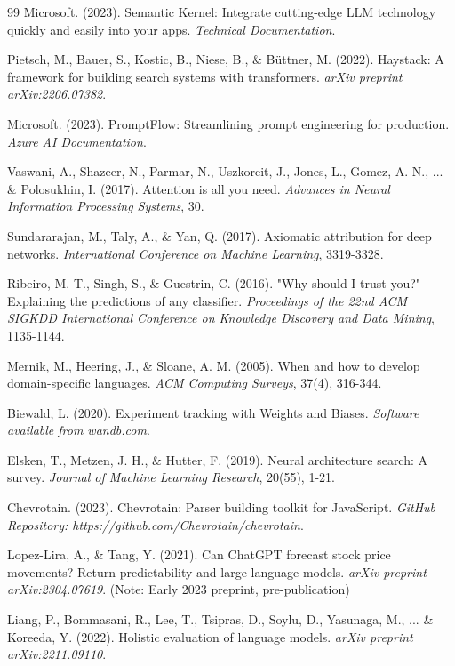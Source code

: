 \documentclass[11pt,a4paper]{article}
\begin{document}
\begin{thebibliography}{99}
Microsoft. (2023).
Semantic Kernel: Integrate cutting-edge LLM technology quickly and easily into your apps.
\textit{Technical Documentation}.

Pietsch, M., Bauer, S., Kostic, B., Niese, B., \& Büttner, M. (2022).
Haystack: A framework for building search systems with transformers.
\textit{arXiv preprint arXiv:2206.07382}.

Microsoft. (2023).
PromptFlow: Streamlining prompt engineering for production.
\textit{Azure AI Documentation}.

Vaswani, A., Shazeer, N., Parmar, N., Uszkoreit, J., Jones, L., Gomez, A. N., ... \& Polosukhin, I. (2017).
Attention is all you need.
\textit{Advances in Neural Information Processing Systems}, 30.

Sundararajan, M., Taly, A., \& Yan, Q. (2017).
Axiomatic attribution for deep networks.
\textit{International Conference on Machine Learning}, 3319-3328.

Ribeiro, M. T., Singh, S., \& Guestrin, C. (2016).
"Why should I trust you?" Explaining the predictions of any classifier.
\textit{Proceedings of the 22nd ACM SIGKDD International Conference on Knowledge Discovery and Data Mining}, 1135-1144.

Mernik, M., Heering, J., \& Sloane, A. M. (2005).
When and how to develop domain-specific languages.
\textit{ACM Computing Surveys}, 37(4), 316-344.

Biewald, L. (2020).
Experiment tracking with Weights and Biases.
\textit{Software available from wandb.com}.

Elsken, T., Metzen, J. H., \& Hutter, F. (2019).
Neural architecture search: A survey.
\textit{Journal of Machine Learning Research}, 20(55), 1-21.

Chevrotain. (2023).
Chevrotain: Parser building toolkit for JavaScript.
\textit{GitHub Repository: https://github.com/Chevrotain/chevrotain}.

Lopez-Lira, A., \& Tang, Y. (2021).
Can ChatGPT forecast stock price movements? Return predictability and large language models.
\textit{arXiv preprint arXiv:2304.07619}. (Note: Early 2023 preprint, pre-publication)

Liang, P., Bommasani, R., Lee, T., Tsipras, D., Soylu, D., Yasunaga, M., ... \& Koreeda, Y. (2022).
Holistic evaluation of language models.
\textit{arXiv preprint arXiv:2211.09110}.


\end{thebibliography}
\end{document}
